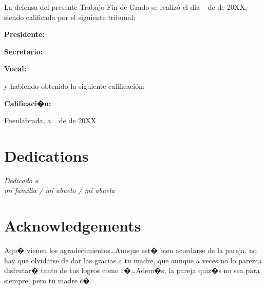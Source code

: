 \documentclass[a4paper, 12pt]{book}
\begin{document}
\vspace{1cm}
La defensa del presente Trabajo Fin de Grado se realizó el día \qquad$\;\,$ de \qquad\qquad\qquad\qquad \newline de 20XX, siendo calificada por el siguiente tribunal:


\vspace{0.5cm}
\textbf{Presidente:}

\vspace{1.2cm}
\textbf{Secretario:}

\vspace{1.2cm}
\textbf{Vocal:}


\vspace{1.2cm}
y habiendo obtenido la siguiente calificación:

\vspace{1cm}
\textbf{Calificaci�n:}


\vspace{1cm}
\begin{flushright}
Fuenlabrada, a \qquad$\;\,$ de \qquad\qquad\qquad\qquad de 20XX
\end{flushright}


\chapter*{Dedications}
\begin{flushright}
\textit{Dedicado a \\
mi familia / mi abuelo / mi abuela}
\end{flushright}


\chapter*{Acknowledgements}

Aqu� vienen los agradecimientos\ldots Aunque est� bien acordarse de la pareja,
no hay que olvidarse de dar las gracias a tu madre, que aunque a veces no lo
parezca disfrutar� tanto de tus logros como t�\ldots Adem�s, la pareja quiz�s
no sea para siempre, pero tu madre s�.
\end{document}
